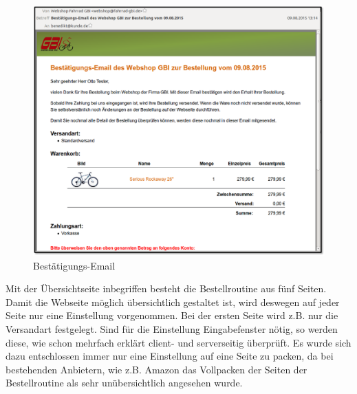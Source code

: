 \begin{figure}[H]
	\begin{center}
			\includegraphics[width=125mm]{Bilder/email.png}
	\end{center}
	\caption{Bestätigungs-Email}
\end{figure}


Mit der Übersichtseite inbegriffen besteht die Bestellroutine aus fünf Seiten. Damit die Webseite möglich übersichtlich gestaltet ist, wird deswegen auf jeder Seite nur eine Einstellung vorgenommen. Bei der ersten Seite wird z.B. nur die Versandart festgelegt. Sind für die Einstellung Eingabefenster nötig, so werden diese, wie schon mehrfach erklärt client- und serverseitig überprüft. Es wurde sich dazu entschlossen immer nur eine Einstellung auf eine Seite zu packen, da bei bestehenden Anbietern, wie z.B. Amazon das \glqq Vollpacken\grqq{} der Seiten der Bestellroutine als sehr unübersichtlich angesehen wurde. 


